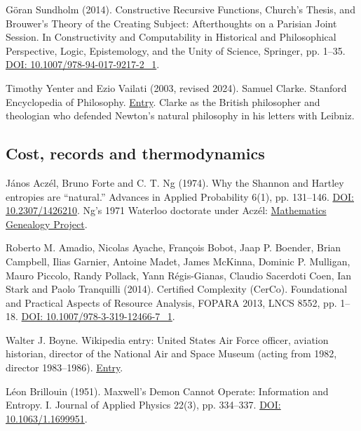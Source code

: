 \documentclass[11pt,twoside]{article}
\theoremstyle{thielethm}
\theoremstyle{thieledef}
\theoremstyle{thieledef}
\theoremstyle{thieledef}
\theoremstyle{thielethm}
\theoremstyle{thieleobs}
\theoremstyle{thielethm}
\begin{document}
\noindent G\"oran Sundholm (2014). Constructive Recursive Functions, Church's Thesis, and Brouwer's Theory of the Creating Subject: Afterthoughts on a Parisian Joint Session. In Constructivity and Computability in Historical and Philosophical Perspective, Logic, Epistemology, and the Unity of Science, Springer, pp. 1--35. \href{https://doi.org/10.1007/978-94-017-9217-2_1}{DOI: 10.1007/978-94-017-9217-2\_1}.
\par\medskip

\noindent Timothy Yenter and Ezio Vailati (2003, revised 2024). Samuel Clarke. Stanford Encyclopedia of Philosophy. \href{https://plato.stanford.edu/entries/clarke/}{Entry}. Clarke as the British philosopher and theologian who defended Newton's natural philosophy in his letters with Leibniz.
\par\medskip

\subsection{Cost, records and thermodynamics}



\noindent J\'anos Acz\'el, Bruno Forte and C. T. Ng (1974). Why the Shannon and Hartley entropies are ``natural.'' Advances in Applied Probability 6(1), pp. 131--146. \href{https://doi.org/10.2307/1426210}{DOI: 10.2307/1426210}. Ng's 1971 Waterloo doctorate under Acz\'el: \href{https://mathgenealogy.org/id.php?id=102040}{Mathematics Genealogy Project}.
\par\medskip

\noindent Roberto M. Amadio, Nicolas Ayache, François Bobot, Jaap P. Boender, Brian Campbell, Ilias Garnier, Antoine Madet, James McKinna, Dominic P. Mulligan, Mauro Piccolo, Randy Pollack, Yann Régis-Gianas, Claudio Sacerdoti Coen, Ian Stark and Paolo Tranquilli (2014). Certified Complexity (CerCo). Foundational and Practical Aspects of Resource Analysis, FOPARA 2013, LNCS 8552, pp. 1--18. \href{https://doi.org/10.1007/978-3-319-12466-7_1}{DOI: 10.1007/978-3-319-12466-7\_1}.
\par\medskip

\noindent Walter J. Boyne. Wikipedia entry: United States Air Force officer, aviation historian, director of the National Air and Space Museum (acting from 1982, director 1983--1986). \href{https://en.wikipedia.org/wiki/Walter_J._Boyne}{Entry}.
\par\medskip

\noindent Léon Brillouin (1951). Maxwell's Demon Cannot Operate: Information and Entropy. I. Journal of Applied Physics 22(3), pp. 334--337. \href{https://doi.org/10.1063/1.1699951}{DOI: 10.1063/1.1699951}.
\par\medskip
\end{document}
